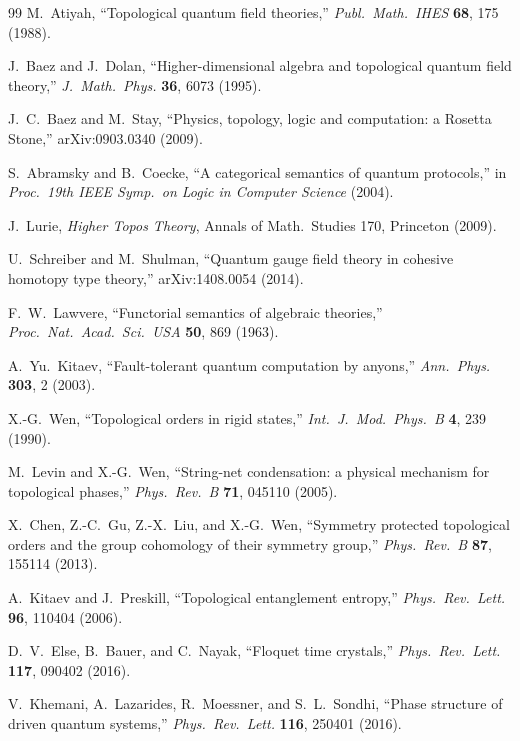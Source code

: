 \documentclass[12pt]{article}
\theoremstyle{definition}
\theoremstyle{remark}
\begin{document}
\begin{thebibliography}{99}
 M.~Atiyah, ``Topological quantum field theories,'' \emph{Publ.\ Math.\ IHES} \textbf{68}, 175 (1988).

 J.~Baez and J.~Dolan, ``Higher-dimensional algebra and topological quantum field theory,'' \emph{J.\ Math.\ Phys.} \textbf{36}, 6073 (1995).

 J.~C.~Baez and M.~Stay, ``Physics, topology, logic and computation: a Rosetta Stone,'' arXiv:0903.0340 (2009).

 S.~Abramsky and B.~Coecke, ``A categorical semantics of quantum protocols,'' in \emph{Proc.\ 19th IEEE Symp.\ on Logic in Computer Science} (2004).

 J.~Lurie, \emph{Higher Topos Theory}, Annals of Math.\ Studies 170, Princeton (2009).

 U.~Schreiber and M.~Shulman, ``Quantum gauge field theory in cohesive homotopy type theory,'' arXiv:1408.0054 (2014).

 F.~W.~Lawvere, ``Functorial semantics of algebraic theories,'' \emph{Proc.\ Nat.\ Acad.\ Sci.\ USA} \textbf{50}, 869 (1963).

 A.~Yu.~Kitaev, ``Fault-tolerant quantum computation by anyons,'' \emph{Ann.\ Phys.} \textbf{303}, 2 (2003).

 X.-G.~Wen, ``Topological orders in rigid states,'' \emph{Int.\ J.\ Mod.\ Phys.\ B} \textbf{4}, 239 (1990).

 M.~Levin and X.-G.~Wen, ``String-net condensation: a physical mechanism for topological phases,'' \emph{Phys.\ Rev.\ B} \textbf{71}, 045110 (2005).

 X.~Chen, Z.-C.~Gu, Z.-X.~Liu, and X.-G.~Wen, ``Symmetry protected topological orders and the group cohomology of their symmetry group,'' \emph{Phys.\ Rev.\ B} \textbf{87}, 155114 (2013).

 A.~Kitaev and J.~Preskill, ``Topological entanglement entropy,'' \emph{Phys.\ Rev.\ Lett.} \textbf{96}, 110404 (2006).

 D.~V.~Else, B.~Bauer, and C.~Nayak, ``Floquet time crystals,'' \emph{Phys.\ Rev.\ Lett.} \textbf{117}, 090402 (2016).

 V.~Khemani, A.~Lazarides, R.~Moessner, and S.~L.~Sondhi, ``Phase structure of driven quantum systems,'' \emph{Phys.\ Rev.\ Lett.} \textbf{116}, 250401 (2016).


\end{thebibliography}
\end{document}
